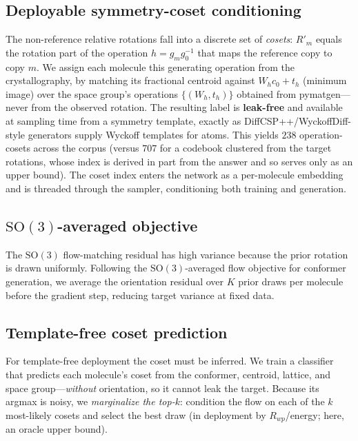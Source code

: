 \documentclass[journal=jcisd8,manuscript=article]{achemso}
\begin{document}
\subsection{Deployable symmetry-coset conditioning}\label{sec:coset}
The non-reference relative rotations fall into a discrete set of \emph{cosets}:
$R'_m$ equals the rotation part of the operation $h=g_mg_0^{-1}$ that maps the
reference copy to copy $m$. We assign each molecule this generating operation from
the crystallography, by matching its fractional centroid against $W_hc_0+t_h$
(minimum image) over the space group's operations $\{(W_h,t_h)\}$ obtained from
pymatgen---never from the observed rotation. The resulting label is
\textbf{leak-free} and available at sampling time from a symmetry template, exactly
as DiffCSP++/WyckoffDiff-style generators supply Wyckoff templates for
atoms\cite{jiao2024diffcsppp,wyckoffdiff2025}. This yields $238$ operation-cosets
across the corpus (versus $707$ for a codebook clustered from the target rotations,
whose index is derived in part from the answer and so serves only as an upper
bound). The coset index enters the network as a per-molecule embedding and is
threaded through the sampler, conditioning both training and generation.

\subsection{$\mathrm{SO}(3)$-averaged objective}
The $\mathrm{SO}(3)$ flow-matching residual has high variance because the prior
rotation is drawn uniformly. Following the $\mathrm{SO}(3)$-averaged flow objective
for conformer generation\cite{cao2025so3averaged}, we average the orientation
residual over $K$ prior draws per molecule before the gradient step, reducing
target variance at fixed data.

\subsection{Template-free coset prediction}
For template-free deployment the coset must be inferred. We train a classifier that
predicts each molecule's coset from the conformer, centroid, lattice, and space
group---\emph{without} orientation, so it cannot leak the target. Because its
argmax is noisy, we \emph{marginalize the top-$k$}: condition the flow on each of
the $k$ most-likely cosets and select the best draw (in deployment by
$R_{wp}$/energy; here, an oracle upper bound).
\end{document}
